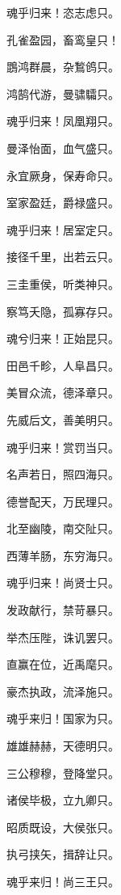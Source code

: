 \documentclass[12pt,a4paper]{ctexbook}
\begin{document}
魂乎归来！恣志虑只。\par
孔雀盈园，畜鸾皇只！\par
鵾鸿群晨，杂鶖鸧只。\par
鸿鹄代游，曼骕驦只。\par
魂乎归来！凤凰翔只。\par
曼泽怡面，血气盛只。\par
永宜厥身，保寿命只。\par
室家盈廷，爵禄盛只。\par
魂乎归来！居室定只。\par
接径千里，出若云只。\par
三圭重侯，听类神只。\par
察笃夭隐，孤寡存只。\par
魂兮归来！正始昆只。\par
田邑千畛，人阜昌只。\par
美冒众流，德泽章只。\par
先威后文，善美明只。\par
魂乎归来！赏罚当只。\par
名声若日，照四海只。\par
德誉配天，万民理只。\par
北至幽陵，南交阯只。\par
西薄羊肠，东穷海只。\par
魂乎归来！尚贤士只。\par
发政献行，禁苛暴只。\par
举杰压陛，诛讥罢只。\par
直赢在位，近禹麾只。\par
豪杰执政，流泽施只。\par
魂乎来归！国家为只。\par
雄雄赫赫，天德明只。\par
三公穆穆，登降堂只。\par
诸侯毕极，立九卿只。\par
昭质既设，大侯张只。\par
执弓挟矢，揖辞让只。\par
魂乎来归！尚三王只。\par
\end{document}
